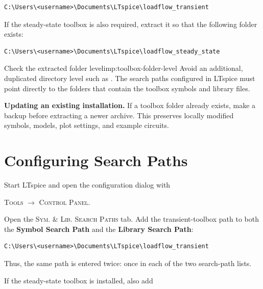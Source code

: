\begin{lstlisting}[style=PlainText]
C:\Users\<username>\Documents\LTspice\loadflow_transient
\end{lstlisting}

If the steady-state toolbox is also required, extract it so that the following
folder exists:

\begin{lstlisting}[style=PlainText]
C:\Users\<username>\Documents\LTspice\loadflow_steady_state
\end{lstlisting}

\begin{important}{Check the extracted folder level}{imp:toolbox-folder-level}
Avoid an additional, duplicated directory level such as
.
The search paths configured in LTspice must point directly to the folders that
contain the toolbox symbols and library files.
\end{important}

\begin{noteBox}
\textbf{Updating an existing installation.}
If a toolbox folder already exists, make a backup before extracting a newer
archive. This preserves locally modified symbols, models, plot settings, and
example circuits.
\end{noteBox}

\section{Configuring Search Paths}
\label{sec:LTspice-search-paths}

Start LTspice and open the configuration dialog with

\begin{center}
\textsc{Tools} $\rightarrow$ \textsc{Control Panel}.
\end{center}

Open the \textsc{Sym. \& Lib. Search Paths} tab. Add the transient-toolbox path
to both the \textbf{Symbol Search Path} and the \textbf{Library Search Path}:


\begin{lstlisting}[style=PlainText]
C:\Users\<username>\Documents\LTspice\loadflow_transient
\end{lstlisting}

Thus, the same path is entered twice: once in each of the two search-path
lists.

If the steady-state toolbox is installed, also add

